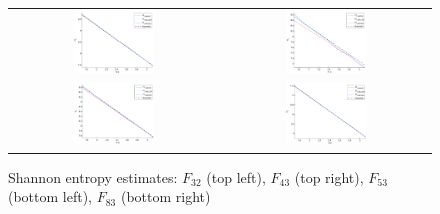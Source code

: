 \documentclass[a4paper,10pt]{article}
\begin{document}
\begin{thebibliography}{99}
\begin{figure}[H]
\centering
\begin{tabular}{cc}
\includegraphics[width=0.4\textwidth]{images4/frac32si.pdf} &
\includegraphics[width=0.4\textwidth]{images4/frac43si.pdf} \\
\includegraphics[width=0.4\textwidth]{images4/frac53si.pdf} &
\includegraphics[width=0.4\textwidth]{images4/frac83si.pdf}
\end{tabular}
\caption{Shannon entropy estimates: $F_{32}$ (top left), $F_{43}$ (top right), $F_{53}$ (bottom left), $F_{83}$ (bottom right) }
\label{fig:fracshan}
\end{figure}




\end{thebibliography}
\end{document}
